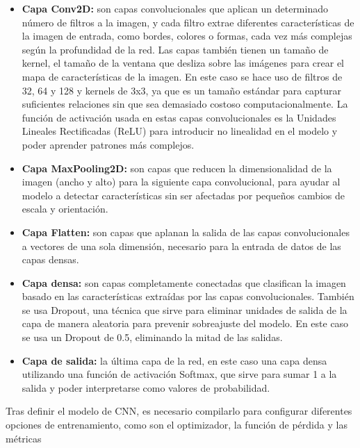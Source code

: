 \documentclass[12pt]{report} %
\begin{document}
\begin{itemize}

    \item \textbf{Capa Conv2D:} son capas convolucionales que aplican un determinado número de filtros a la imagen, y cada filtro extrae diferentes características de la imagen de entrada, como bordes, colores o formas, cada vez más complejas según la profundidad de la red. Las capas también tienen un tamaño de kernel, el tamaño de la ventana que desliza sobre las imágenes para crear el mapa de características de la imagen. En este caso se hace uso de filtros de 32, 64 y 128 y kernels de 3x3, ya que es un tamaño estándar para capturar suficientes relaciones sin que sea demasiado costoso computacionalmente. La función de activación usada en estas capas convolucionales es la  Unidades Lineales Rectificadas (ReLU) para introducir no linealidad en el modelo y poder aprender patrones más complejos. 
    \item \textbf{Capa MaxPooling2D:} son capas que reducen la dimensionalidad de la imagen (ancho y alto) para la siguiente capa convolucional, para ayudar al modelo a detectar características sin ser afectadas por pequeños cambios de escala y orientación.
    \item \textbf{Capa Flatten:} son capas que aplanan la salida de las capas convolucionales a vectores de una sola dimensión, necesario para la entrada de datos de las capas densas.
	\item \textbf{Capa densa:} son capas completamente conectadas que clasifican la imagen basado en las características extraídas por las capas convolucionales. También se usa Dropout, una técnica que sirve para eliminar unidades de salida de la capa de manera aleatoria para prevenir sobreajuste del modelo. En este caso se usa un Dropout de 0.5, eliminando la mitad de las salidas.
	\item \textbf{Capa de salida:} la última capa de la red, en este caso una capa densa utilizando una función de activación Softmax, que sirve para sumar 1 a la salida y poder interpretarse como valores de probabilidad. 

\end{itemize}

Tras definir el modelo de CNN, es necesario compilarlo para configurar diferentes opciones de entrenamiento, como son el optimizador, la función de pérdida y las métricas
\end{document}
